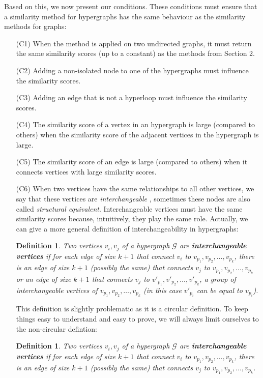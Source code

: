 \documentclass[a4paper,11pt]{report}
\newtheorem{definition}[theorem]{Definition}
\newcommand{\hgraf}{\mathcal{G}}
\begin{document}
 
Based on this, we now present our conditions. These conditions must ensure that 
a similarity method for hypergraphs has the same behaviour as the similarity 
methods for graphs:
\begin{itemize}
  \item[(C1)] When the method is applied on two undirected graphs, it must return the same 
  similarity scores (up to a constant) as the methods from Section 2.
  \item[(C2)] Adding a non-isolated node to one of the hypergraphs must influence 
  the similarity scores.
  \item[(C3)] Adding an edge that is not a hyperloop 
  must influence the similarity scores.
  \item[(C4)] The similarity score of a vertex in an hypergraph is large (compared to others) when the similarity score 
  of the adjacent vertices in the hypergraph is large.
  \item[(C5)] The similarity score of an edge is large (compared to others) when it connects vertices 
  with large similarity scores.
  \item[(C6)] When two vertices have the same relationships to all other vertices, we say 
  that these vertices are \emph{interchangeable} , sometimes these nodes
  are also called \emph{structural equivalent}. Interchangeable vertices must have 
  the same similarity scores because, intuitively, they play the same role. 
  Actually, we can give a more general definition of interchangeability in 
  hypergraphs:
  \begin{definition}\label{definterhyp}
    Two vertices $v_i, v_j$ of a hypergraph $\hgraf$ are \textbf{interchangeable 
    vertices}
  if for each edge of size $k+1$ that connect $v_i$ to $v_p_1, v_p_2,\ldots, v_p_k$, there is an edge of size $k+1$ (possibly the same) that connects
  $v_j$ to $v_p_1, v_p_2,\ldots, v_p_k$ or an edge of size $k+1$ that connects $v_j$ to $v'_p_1, v'_p_2, \ldots, v'_p_k$, a group
  of interchangeable vertices of  $v_p_1, v_p_2,\ldots, v_p_k$ (in this case $v'_p_i$ can be equal to 
  $v_p_i$).
  \end{definition}
   This definition is slightly problematic 
as it is a circular definition. To keep things easy to understand and easy to 
prove, we will always limit ourselves to the non-circular defintion:
\begin{definition}\label{definterhyp}
    Two vertices $v_i, v_j$ of a hypergraph $\hgraf$ are \textbf{interchangeable 
    vertices}
  if for each edge of size $k+1$ that connect $v_i$ to $v_p_1, v_p_2,\ldots, v_p_k$, there is an edge of size $k+1$ (possibly the same) that connects
  $v_j$ to $v_p_1, v_p_2,\ldots, v_p_k$.  \end{definition}


\end{itemize}
\end{document}
